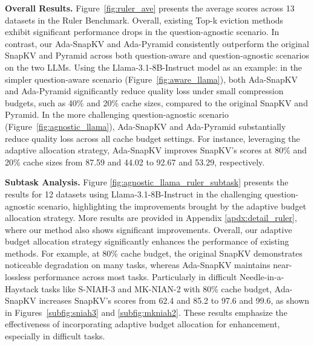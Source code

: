 \textbf{Overall Results.}
Figure~\ref{fig:ruler_ave} presents the average scores across 13 datasets in the Ruler Benchmark.
Overall, existing Top-k eviction methods exhibit significant performance drops in the question-agnostic scenario.
In contrast, our Ada-SnapKV and Ada-Pyramid consistently outperform the original SnapKV and Pyramid across both question-aware and question-agnostic scenarios on the two LLMs.
Using the Llama-3.1-8B-Instruct model as an example: in the simpler question-aware scenario (Figure~\ref{fig:aware_llama}), both Ada-SnapKV and Ada-Pyramid significantly reduce quality loss under small compression budgets, such as 40\% and 20\% cache sizes, compared to the original SnapKV and Pyramid. In the more challenging question-agnostic scenario (Figure~\ref{fig:agnostic_llama}), Ada-SnapKV and Ada-Pyramid substantially reduce quality loss across all cache budget settings.
For instance, leveraging the adaptive allocation strategy, Ada-SnapKV improves SnapKV's scores at 80\% and 20\% cache sizes from 87.59 and 44.02 to 92.67 and 53.29, respectively.





\textbf{Subtask Analysis.}
Figure \ref{fig:agnostic_llama_ruler_subtask} presents the results for 12 datasets using Llama-3.1-8B-Instruct in the challenging question-agnostic scenario, highlighting the improvements brought by the adaptive budget allocation strategy. More results are provided in Appendix \ref{apdx:detail_ruler}, where our method also shows significant improvements.
Overall, our adaptive budget allocation strategy significantly enhances the performance of existing methods.
For example, at 80\% cache budget, the original SnapKV demonstrates noticeable degradation on many tasks, whereas Ada-SnapKV maintains near-lossless performance across most tasks.
Particularly in difficult Needle-in-a-Haystack tasks like S-NIAH-3 and MK-NIAN-2 with 80\% cache budget, Ada-SnapKV increases SnapKV's scores from 62.4 and 85.2 to 97.6 and 99.6, as shown in Figures~\ref{subfig:sniah3} and \ref{subfig:mkniah2}.
 These results emphasize the effectiveness of incorporating adaptive budget allocation for enhancement, especially in difficult tasks.




